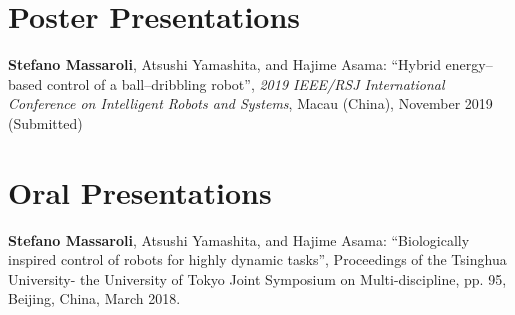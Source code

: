 \section*{Poster Presentations}
\begin{enumerate}[{[}p1{]}]
\item \textbf{Stefano Massaroli}, Atsushi Yamashita, and Hajime Asama: ``Hybrid energy--based control of a ball--dribbling robot'', \textit{2019 IEEE/RSJ International Conference on Intelligent Robots and Systems}, Macau (China), November 2019 (Submitted)%
\end{enumerate}

\section*{Oral Presentations}
\begin{enumerate}[{[}o1{]}]
	\item \textbf{Stefano Massaroli}, Atsushi Yamashita, and Hajime Asama: ``Biologically inspired control of robots for highly dynamic tasks'', Proceedings of the Tsinghua University- the University of Tokyo
	Joint Symposium on Multi-discipline, pp. 95, Beijing, China, March 2018.
\end{enumerate}